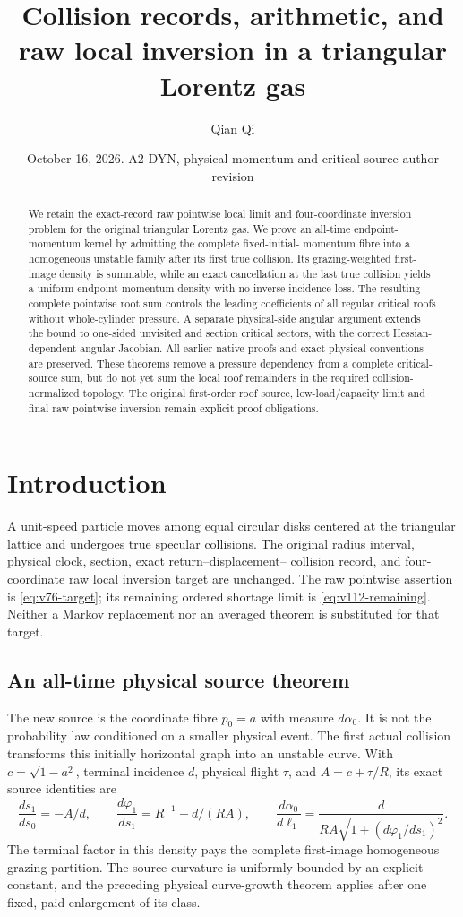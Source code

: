 \documentclass[11pt,reqno]{amsart}
\title[Collision records and raw local inversion]{Collision records, arithmetic, and raw local inversion in a triangular Lorentz gas}
\author{Qian Qi}
\date{October 16, 2026. A2-DYN, physical momentum and critical-source author revision}
\numberwithin{equation}{section}
\theoremstyle{definition}\newtheorem{definition}[theorem]{Definition}
\theoremstyle{remark}\newtheorem{remark}[theorem]{Remark}
\begin{document}
\raggedbottom
\begin{abstract}
We retain the exact-record raw pointwise local limit and four-coordinate
inversion problem for the original triangular Lorentz gas. We prove an
all-time endpoint-momentum kernel by admitting the complete fixed-initial-
momentum fibre into a homogeneous unstable family after its first true
collision. Its grazing-weighted first-image density is summable, while
an exact cancellation at the last true collision yields a uniform
endpoint-momentum density with no inverse-incidence loss. The resulting
complete pointwise root sum controls the leading coefficients of all
regular critical roofs without whole-cylinder pressure. A separate
physical-side angular argument extends the bound to one-sided unvisited
and section critical sectors, with the correct Hessian-dependent angular
Jacobian. All earlier native proofs and exact physical conventions are
preserved. These theorems remove a pressure dependency from a complete
critical-source sum, but do not yet sum the local roof remainders in the
required collision-normalized topology. The original first-order roof
source, low-load/capacity limit and final raw pointwise inversion remain
explicit proof obligations.
\end{abstract}
\maketitle
\enlargethispage{8pt}

\section*{Introduction}
A unit-speed particle moves among equal circular disks centered at the
triangular lattice and undergoes true specular collisions. The original
radius interval, physical clock, section, exact return--displacement--
collision record, and four-coordinate raw local inversion target are
unchanged. The raw pointwise assertion is \eqref{eq:v76-target}; its
remaining ordered shortage limit is \eqref{eq:v112-remaining}. Neither a
Markov replacement nor an averaged theorem is substituted for that target.

\subsection*{An all-time physical source theorem}
The new source is the coordinate fibre $p_0=a$ with measure $d\alpha_0$.
It is not the probability law conditioned on a smaller physical event.
The first actual collision transforms this initially horizontal graph
into an unstable curve. With $c=\sqrt{1-a^2}$, terminal incidence $d$,
physical flight $\tau$, and $A=c+\tau/R$, its exact source identities are
\[
 \frac{ds_1}{ds_0}=-A/d,\qquad
 \frac{d\varphi_1}{ds_1}=R^{-1}+d/(RA),\qquad
 \frac{d\alpha_0}{d\ell_1}
     =\frac{d}{RA\sqrt{1+(d\varphi_1/ds_1)^2}}.
\]
The terminal factor in this density pays the complete first-image
homogeneous grazing partition. The source curvature is uniformly
bounded by an explicit constant, and the preceding physical curve-growth
theorem applies after one fixed, paid enlargement of its class.
\end{document}
